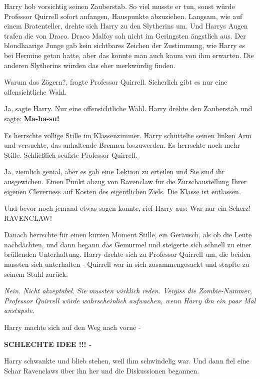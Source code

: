 Harry hob vorsichtig seinen Zauberstab. So viel musste er tun, sonst würde
Professor Quirrell sofort anfangen, Hauspunkte abzuziehen. Langsam, wie auf
einem Bratenteller, drehte sich Harry zu den Slytherins um. Und Harrys Augen
trafen die von Draco. Draco Malfoy sah nicht im Geringsten ängstlich aus. Der
blondhaarige Junge gab kein sichtbares Zeichen der Zustimmung, wie Harry es bei
Hermine getan hatte, aber das konnte man auch kaum von ihm erwarten. Die anderen
Slytherins würden das eher merkwürdig finden.

\glqq Warum das Zögern?\grqq{}, fragte Professor Quirrell. \glqq Sicherlich gibt
es nur eine offensichtliche Wahl.\grqq{}

\glqq Ja\grqq{}, sagte Harry. \glqq Nur eine offensichtliche Wahl.\grqq{} Harry
drehte den Zauberstab und sagte: \textbf{\glqq Ma-ha-su!\grqq{} }

Es herrschte völlige Stille im Klassenzimmer. Harry schüttelte seinen linken Arm
und versuchte, das anhaltende Brennen loszuwerden. Es herrschte noch mehr
Stille. Schließlich seufzte Professor Quirrell.

\glqq Ja, ziemlich genial, aber es gab eine Lektion zu erteilen und Sie sind ihr
ausgewichen. Einen Punkt abzug von Ravenclaw für die Zurschaustellung Ihrer
eigenen Cleverness auf Kosten des eigentlichen Ziels. Die Klasse ist
entlassen.\grqq{}

Und bevor noch jemand etwas sagen konnte, rief Harry aus: \glqq War nur ein
Scherz! RAVENCLAW!\grqq{}

Danach herrschte für einen kurzen Moment Stille, ein Geräusch, als ob die Leute
nachdächten, und dann begann das Gemurmel und steigerte sich schnell zu einer
brüllenden Unterhaltung. Harry drehte sich zu Professor Quirrell um, die beiden
mussten sich unterhalten - Quirrell war in sich zusammengesackt und stapfte zu
seinem Stuhl zurück.

\emph{Nein. Nicht akzeptabel. Sie mussten wirklich reden. Vergiss die
Zombie-Nummer, Professor Quirrell würde wahrscheinlich aufwachen, wenn Harry ihn
ein paar Mal anstupste. }

Harry machte sich auf den Weg nach vorne -

\textbf{SCHLECHTE IDEE !!! -}

Harry schwankte und blieb stehen, weil ihm schwindelig war. Und dann fiel eine
Schar Ravenclaws über ihn her und die Diskussionen begannen.